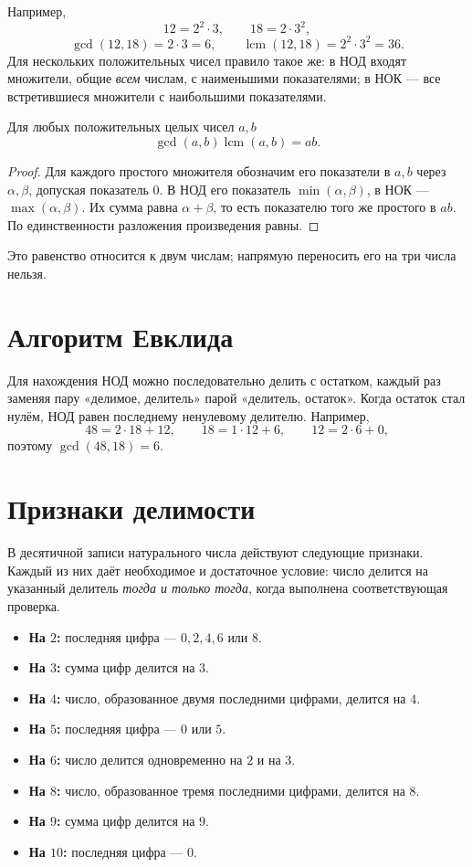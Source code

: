 Например,
\[
12=2^2\cdot3,\qquad18=2\cdot3^2,
\]
\[
\gcd(12,18)=2\cdot3=6,\qquad
\operatorname{lcm}(12,18)=2^2\cdot3^2=36.
\]
Для нескольких положительных чисел правило такое же:
в НОД входят множители, общие \emph{всем} числам, с наименьшими показателями;
в НОК --- все встретившиеся множители с наибольшими показателями.

\begin{theorem}\label{thm:legacy-c02-2}
Для любых положительных целых чисел \(a,b\)
\[
\gcd(a,b)\operatorname{lcm}(a,b)=ab.
\]
\end{theorem}
\begin{proof}Для каждого простого множителя обозначим его показатели в \(a,b\) через \(\alpha,\beta\), допуская показатель \(0\). В НОД его показатель \(\min(\alpha,\beta)\), в НОК — \(\max(\alpha,\beta)\). Их сумма равна \(\alpha+\beta\), то есть показателю того же простого в \(ab\). По единственности разложения произведения равны.\end{proof}
Это равенство относится к двум числам; напрямую переносить его на три числа нельзя.

\section{Алгоритм Евклида}

Для нахождения НОД можно последовательно делить с остатком,
каждый раз заменяя пару «делимое, делитель» парой «делитель, остаток».
Когда остаток стал нулём, НОД равен последнему ненулевому делителю.
Например,
\[
48=2\cdot18+12,\qquad
18=1\cdot12+6,\qquad
12=2\cdot6+0,
\]
поэтому \(\gcd(48,18)=6\).

\section{Признаки делимости}

В десятичной записи натурального числа действуют следующие признаки.
Каждый из них даёт необходимое и достаточное условие: число делится на указанный делитель
\emph{тогда и только тогда}, когда выполнена соответствующая проверка.

\begin{itemize}[leftmargin=1.5em,itemsep=4pt]
\item \textbf{На \(2\):} последняя цифра --- \(0,2,4,6\) или \(8\).
\item \textbf{На \(3\):} сумма цифр делится на \(3\).
\item \textbf{На \(4\):} число, образованное двумя последними цифрами, делится на \(4\).
\item \textbf{На \(5\):} последняя цифра --- \(0\) или \(5\).
\item \textbf{На \(6\):} число делится одновременно на \(2\) и на \(3\).
\item \textbf{На \(8\):} число, образованное тремя последними цифрами, делится на \(8\).
\item \textbf{На \(9\):} сумма цифр делится на \(9\).
\item \textbf{На \(10\):} последняя цифра --- \(0\).
\end{itemize}

